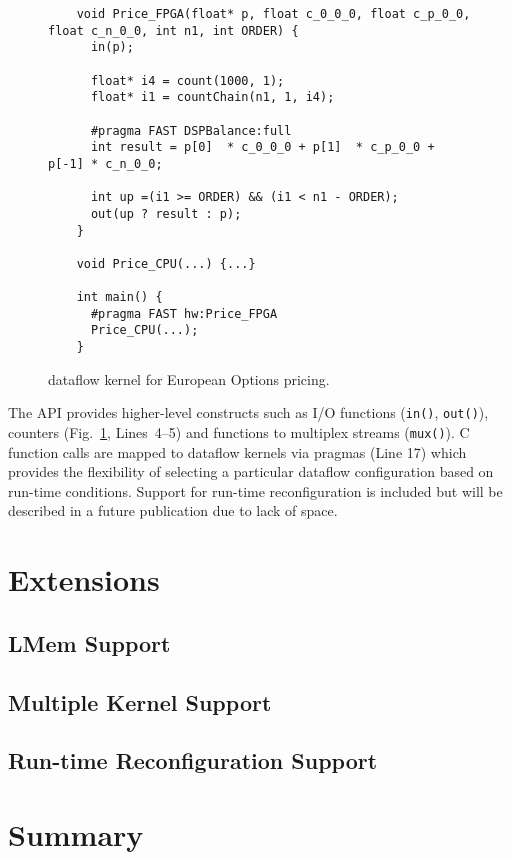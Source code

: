 \lstset{style=MaxC}

\begin{figure}[!h]
  \begin{lstlisting}
    void Price_FPGA(float* p, float c_0_0_0, float c_p_0_0, float c_n_0_0, int n1, int ORDER) {
      in(p);

      float* i4 = count(1000, 1);
      float* i1 = countChain(n1, 1, i4);

      #pragma FAST DSPBalance:full
      int result = p[0]  * c_0_0_0 + p[1]  * c_p_0_0 + p[-1] * c_n_0_0;

      int up =(i1 >= ORDER) && (i1 < n1 - ORDER);
      out(up ? result : p);
    }

    void Price_CPU(...) {...}

    int main() {
      #pragma FAST hw:Price_FPGA
      Price_CPU(...);
    }
  \end{lstlisting}
  \caption{\FAST{} dataflow kernel for European Options
    pricing.}
  \label{fig:maxc-1dconv}
\end{figure}


The \FAST{} API provides higher-level constructs such as I/O functions
(\texttt{in()}, \texttt{out()}), counters (Fig.~\ref{fig:maxc-1dconv},
Lines~4--5) and functions to multiplex streams (\texttt{mux()}). C
function calls are mapped to dataflow kernels via pragmas (Line 17)
which provides the flexibility of selecting a particular dataflow
configuration based on run-time conditions. Support for run-time
reconfiguration is included but will be described in a future
publication due to lack of space.

\section{Extensions}

\subsection{LMem Support}
\subsection{Multiple Kernel Support}
\subsection{Run-time Reconfiguration Support}

\section{Summary}

